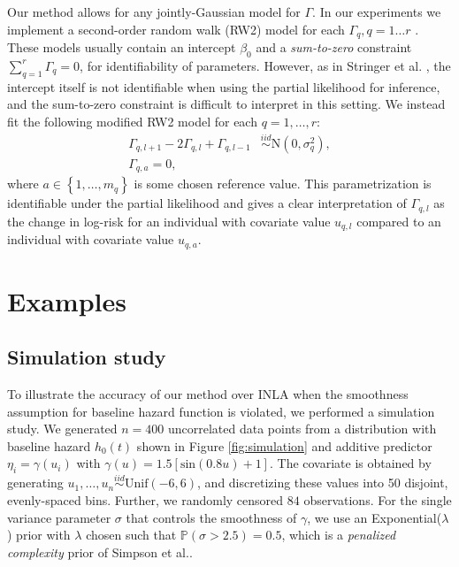 \documentclass[AMA,STIX1COL,doublespace]{WileyNJD-v2}
\begin{document}
Our method allows for any jointly-Gaussian model for $\Gamma$. In our experiments we implement a second-order random walk (RW2) model for each $\Gamma_{q},q = 1\ldots r$ \cite{rw2}. These models usually contain an intercept $\beta_{0}$ and a \emph{sum-to-zero} constraint $\sum_{q=1}^{r}\Gamma_{q} = 0$, for identifiability of parameters. However, as in Stringer et al. \cite{casecross}, the intercept itself is not identifiable when using the partial likelihood for inference, and the sum-to-zero constraint is difficult to interpret in this setting. We instead fit the following modified RW2 model for each $q = 1,\ldots,r$:
\begin{equation}\begin{aligned}\label{eqn:rw2}
\Gamma_{q,l+1} - 2\Gamma_{q,l} + \Gamma_{q,l-1} &\overset{iid}{\sim}\text{N}\left( 0,\sigma^{2}_{q}\right), \\
\Gamma_{q,a} = 0,
\end{aligned}\end{equation}
where $a\in\left\lbrace 1,\ldots,m_{q}\right\rbrace$ is some chosen reference value. This parametrization is identifiable under the partial likelihood and gives a clear interpretation of $\Gamma_{q,l}$ as the change in log-risk for an individual with covariate value $u_{q,l}$ compared to an individual with covariate value $u_{q,a}$. 



\section{Examples}\label{sec:example}

\subsection{Simulation study}

To illustrate the accuracy of our method over INLA when the smoothness assumption for baseline hazard function is violated, we performed a simulation study. We generated $n = 400$ uncorrelated data points from a distribution with baseline hazard $h_{0}(t)$ shown in Figure \ref{fig:simulation} and additive predictor $\eta_{i} = \gamma(u_{i})$ with $\gamma(u) = 1.5 [ \text{sin}(0.8u) + 1 ]$. The covariate is obtained by generating $u_{1},\ldots,u_{n}\overset{iid}{\sim}\text{Unif}(-6,6)$, and discretizing these values into 50 disjoint, evenly-spaced bins. Further, we randomly censored $84$ observations. For the single variance parameter $\sigma$ that controls the smoothness of $\gamma$, we use an Exponential($\lambda$) prior with $\lambda$ chosen such that $\mathbb{P}\left( \sigma > 2.5\right) = 0.5$, which is a \emph{penalized complexity} prior of Simpson et al.\cite{pcprior}.
\end{document}
